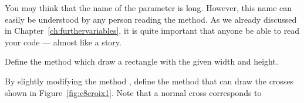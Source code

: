You may think that the name of the parameter  is long. However, this name can easily be understood by any person reading the method. As we already discussed in Chapter~\ref{ch:furthervariables}, it is quite important that anyone be able to read your code --- almost like a story. 

\begin{exonofig}
Define the method  which draw a rectangle with the given width and height.
\end{exonofig}

\begin{exonofig}
By slightly modifying the method , define the method
 that can draw the crosses shown in
Figure~\ref{fig:c8croix1}.  Note that a normal cross corresponds to
\end{exonofig}


